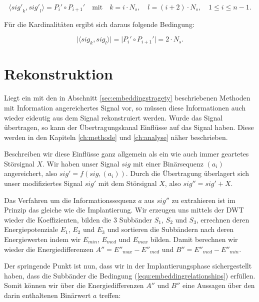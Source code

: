 	\begin{equation}
		\langle{sig'}_{k},{sig'}_{l}\rangle = {P}_{i}'\circ{P}_{i+1}' \quad\mbox{mit}\quad k=i \cdot {N}_{s},\quad l=(i+2) \cdot {N}_{s},\quad {1}\leq{i}\leq{n-1}.
		\label{equ:signalconcat}
	\end{equation}

Für die Kardinalitäten ergibt sich daraus folgende Bedingung:

	\begin{equation}
 	   \vert\langle{sig}_{k},{sig}_{l}\rangle\vert = \vert{P}_{i}'\circ{P}_{i+1}'\vert = 2 \cdot {N}_{s}.
	   \label{equ:signalcardinality}
	\end{equation}

\section{Rekonstruktion}

Liegt ein mit den in Abschnitt \ref{sec:embeddingstragety} beschriebenen Methoden mit Information angereichertes Signal vor, so müssen diese Informationen auch wieder eideutig aus dem Signal rekonstruiert werden. Wurde das Signal übertragen, so kann der Übertragungskanal Einflüsse auf das Signal haben. Diese werden in den Kapiteln \ref{ch:methode} und \ref{ch:analyse} näher beschrieben. 

Beschreiben wir diese Einflüsse ganz allgemein als ein wie auch immer geartetes Störsignal $X$. Wir haben unser Signal $sig$ mit einer Binärsequenz $({a}_{i})$ angereichert, also $sig' = f( sig, ({a}_{i}))$. Durch die Übertragung überlagert sich unser modifiziertes Signal $sig'$ mit dem Störsignal $X$, also $sig'' = sig' + X$.

Das Verfahren um die Informationssequenz $a$ aus $sig''$ zu extrahieren ist im Prinzip das gleiche wie die Implantierung. Wir erzeugen uns mittels der DWT wieder die Koeffizienten, bilden die 3 Subbänder ${S}_{1}$, ${S}_{2}$ und ${S}_{3}$, errechnen deren Energiepotenziale ${E}_{1}$, ${E}_{2}$ und ${E}_{3}$ und sortieren die Subbändern nach deren Energiewerten indem wir ${E}_{min}$, ${E}_{med}$ und ${E}_{max}$ bilden. Damit berechnen wir wieder die Energiedifferenzen $A'' = {E''}_{max} - {E''}_{med}$ und $B'' = {E''}_{med} - {E''}_{min}$.

Der springende Punkt ist nun, dass wir in der Implantierungsphase sichergestellt haben, dass die Subbänder die Bedingung (\ref{equ:embeddingrelationships}) erfüllen. Somit können wir über die Energiedifferenzen $A''$ und $B''$ eine Aussagen über den darin enthaltenen Binärwert $a$ treffen:

